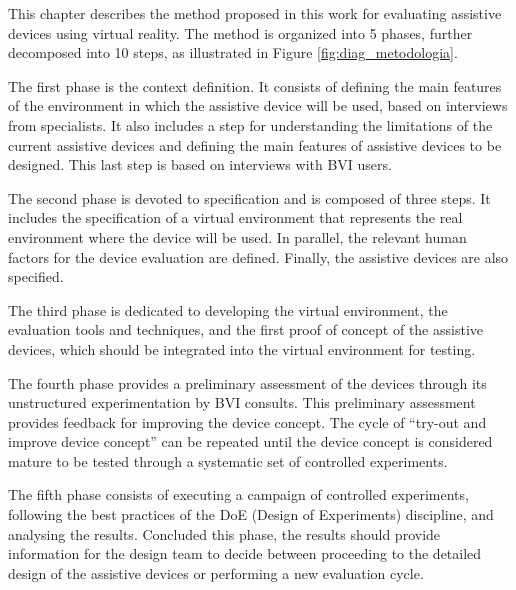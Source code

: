 


This chapter describes the method proposed in this work for evaluating assistive devices using virtual reality. The method is organized into 5 phases, further decomposed into 10 steps, as illustrated in Figure \ref{fig:diag_metodologia}.





The first phase is the context definition. It consists of defining the main features of the environment in which the assistive device will be used, based on interviews from specialists. It also includes a step for understanding the limitations of the current assistive devices and defining the main features of assistive devices to be designed. This last step is based on interviews with BVI users.

The second phase is devoted to specification and is composed of three steps. It includes the specification of a virtual environment that represents the real environment where the device will be used. In parallel, the relevant human factors for the device evaluation are defined. Finally, the assistive devices are also specified.

The third phase is dedicated to developing the virtual environment, the evaluation tools and techniques, and the first proof of concept of the assistive devices, which should be integrated into the virtual environment for testing. 

The fourth phase provides a preliminary assessment of the devices through its unstructured experimentation by BVI consults. This preliminary assessment provides feedback for improving the device concept. The cycle of “try-out and improve device concept” can be repeated until the device concept is considered mature to be tested through a systematic set of controlled experiments.

The fifth phase consists of executing a campaign of controlled experiments, following the best practices of the DoE (Design of Experiments) discipline, and analysing the results. Concluded this phase, the results should provide information for the design team to decide between proceeding to the detailed design of the assistive devices or performing a new evaluation cycle.

